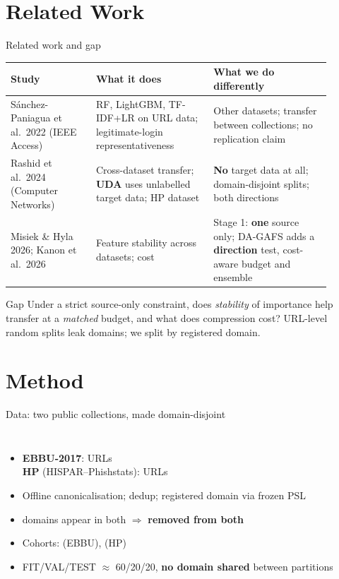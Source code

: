 \documentclass[aspectratio=169,10pt]{beamer}
\newcommand{\key}[1]{{\color{acc}\textbf{#1}}}
\begin{document}
\section{Related Work}
\begin{frame}{Related work and gap}
\small
\begin{tabular}{p{0.24\linewidth}p{0.33\linewidth}p{0.33\linewidth}}
\toprule
Study & What it does & What we do differently \\
\midrule
S\'anchez-Paniagua et al.\ 2022 (IEEE Access) & RF, LightGBM, TF-IDF+LR on URL data; legitimate-login representativeness & Other datasets; transfer between collections; no replication claim \\
Rashid et al.\ 2024 (Computer Networks) & Cross-dataset transfer; \key{UDA} uses unlabelled target data; HP dataset & \key{No} target data at all; domain-disjoint splits; both directions \\
Misiek \& Hyla 2026; Kanon et al.\ 2026 & Feature stability across datasets; cost & Stage 1: \key{one} source only; DA-GAFS adds a \key{direction} test, cost-aware budget and ensemble \\
\bottomrule
\end{tabular}
\vspace{1em}
\begin{block}{Gap}
Under a strict source-only constraint, does \emph{stability} of importance help transfer at a \emph{matched} budget, and what does compression cost? URL-level random splits leak domains; we split by registered domain.
\end{block}
\end{frame}

\section{Method}
\begin{frame}{Data: two public collections, made domain-disjoint}
\begin{columns}[T]
\begin{itemize}
\item \key{EBBU-2017}:  URLs \\ \key{HP} (HISPAR--Phishstats):  URLs
\item Offline canonicalisation; dedup; registered domain via frozen PSL
\item {} domains appear in both $\Rightarrow$ \key{removed from both}
\item Cohorts:  (EBBU),  (HP)
\item FIT/VAL/TEST $\approx$ 60/20/20, \key{no domain shared} between partitions
\end{itemize}
\scriptsize
\resizebox{\linewidth}{!}{}
\end{columns}
\end{frame}
\end{document}
